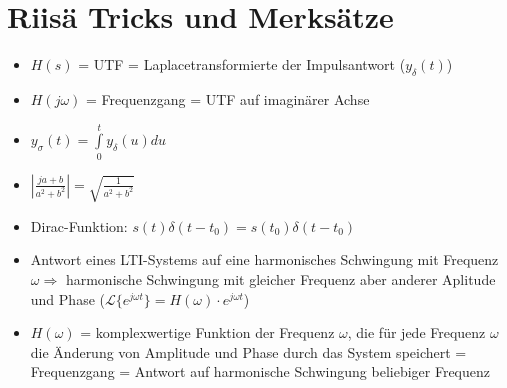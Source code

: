 \section{Riisä Tricks und Merksätze}
\begin{itemize}
  \item $H(s)$ = UTF = Laplacetransformierte der Impulsantwort ($y_\delta(t)$)
  \item $H(j \omega)$ = Frequenzgang = UTF auf imaginärer Achse
  \item $y_\sigma(t) = \int\limits_0^t y_\delta(u)du$
  \item $\left| \frac{ja + b}{a^2 + b^2} \right| = \sqrt{\frac{1}{a^2 + b^2}}$
  \item Dirac-Funktion: $s(t)\delta(t-t_0) = s(t_0)\delta(t-t_0)$
  \item Antwort eines LTI-Systems auf eine harmonisches Schwingung mit Frequenz $\omega \Rightarrow$ harmonische
  Schwingung mit gleicher Frequenz aber anderer Aplitude und Phase ($\mathcal{L}\{e^{j \omega t}\} = H(\omega) \cdot
  e^{j \omega t}$)
  \item $H(\omega)$ = komplexwertige Funktion der Frequenz $\omega$, die für jede Frequenz $\omega$ die
  Änderung von Amplitude und Phase durch das System speichert = Frequenzgang = Antwort auf harmonische Schwingung
  beliebiger Frequenz
\end{itemize}
